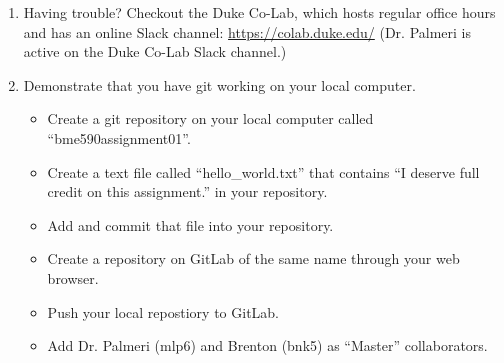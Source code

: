 \begin{enumerate}
\item Having trouble?  Checkout the Duke Co-Lab, which hosts regular office hours and has an online Slack channel: \url{https://colab.duke.edu/}  (Dr. Palmeri is active on the Duke Co-Lab Slack channel.)

\item Demonstrate that you have git working on your local computer.
\begin{itemize}
\item Create a git repository on your local computer called ``bme590assignment01''.
\item Create a text file called ``hello\_world.txt'' that contains ``I deserve full credit on this assignment.'' in your repository.
\item Add and commit that file into your repository.
\item Create a repository on GitLab of the same name through your web browser.
\item Push your local repostiory to GitLab.
\item Add Dr. Palmeri (mlp6) and Brenton (bnk5) as ``Master'' collaborators.
\end{itemize}

\end{enumerate}


